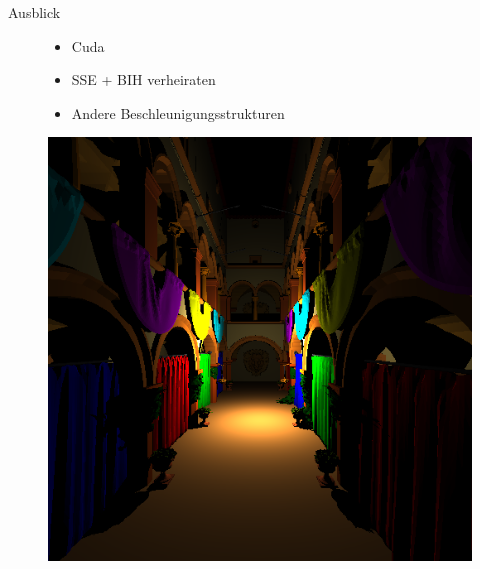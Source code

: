	\begin{frame}{Ausblick}
		\begin{figure}[ht]
		\vspace{1cm}
		\begin{minipage}{0.45\linewidth}
			\begin{itemize}
				\item Cuda
				\item SSE + BIH verheiraten
				\item Andere Beschleunigungsstrukturen
			\end{itemize}
			\vspace{4.5cm}
		\end{minipage}
		\begin{minipage}[b]{0.45\linewidth}
			\centering
			\includegraphics[width=\textwidth]{images/sponza.png}
		\end{minipage}
	\end{figure}
		
	\end{frame}

